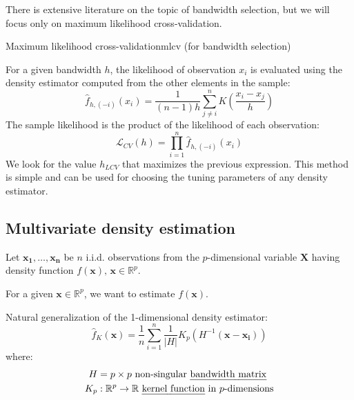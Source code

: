 There is extensive literature on the topic of bandwidth selection, but we will
focus only on maximum likelihood cross-validation.

\begin{definition}{Maximum likelihood cross-validation}{mlcv}
	(for bandwidth selection)

	For a given bandwidth $h$, the likelihood of observation $x_i$ is evaluated
	using the density estimator computed from the other elements in the sample:
	\begin{equation*}
		\hat{f}_{h,(-i)}(x_i) = \frac{1}{(n-1)h}\sum_{j \neq i}^n K\left( \frac{x_i - x_j}{h} \right)
	\end{equation*}
	The sample likelihood is the product of the likelihood of each observation:
	\begin{equation*}
		\mathcal{L}_{CV}(h) = \prod_{i=1}^n \hat{f}_{h,(-i)}(x_i)
	\end{equation*}
	We look for the value $h_{LCV}$ that maximizes the previous expression.
	\tcblower
	This method is simple and can be used for choosing the tuning parameters of any density estimator.
\end{definition}



\subsection{Multivariate density estimation}

Let $\boldsymbol{x_1}, \dots, \boldsymbol{x_n}$ be $n$ i.i.d. observations
from the $p$-dimensional variable $\boldsymbol{X}$ having density
function $f(\boldsymbol x),\,\boldsymbol x \in \mathbb{R}^p$.

For a given $\boldsymbol x \in \mathbb{R}^p$, we want to estimate $f(\boldsymbol x)$.

Natural generalization of the 1-dimensional density estimator:
\begin{equation*}
	\widehat{f}_K(\boldsymbol{x}) = \frac{1}{n}\sum_{i=1}^n
	\frac{1}{|H|}K_p\left(
	H^{-1}\left(\boldsymbol{x} - \boldsymbol{x_i}\right)
	\right)
\end{equation*}
where:
\begin{align*}
	H   & = p \times p \text{ non-singular \iemph{bandwidth matrix}}                             \\
	K_p & : \mathbb{R}^p \to \mathbb{R} \text{ \iemph{kernel function} in } p \text{-dimensions}
\end{align*}

